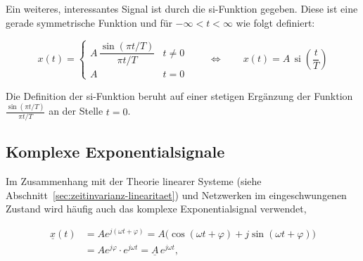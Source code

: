\begin{definition}[si-Funktion]
Ein weiteres, interessantes Signal ist durch die si-Funktion gegeben. Diese ist eine gerade symmetrische Funktion und für $-\infty < t < \infty$ wie folgt definiert:

$$
  x(t) =
  \begin{cases}
    A\,\dfrac{\sin(\pi t/T)}{\pi t/T} & t \neq 0 \\[6pt]
    A                                  & t = 0
  \end{cases}
  \qquad \Leftrightarrow \qquad
  x(t) = A\,\operatorname{si}\!\left(\frac{t}{T}\right)
$$

Die Definition der si-Funktion beruht auf einer stetigen Ergänzung der Funktion $\frac{\sin(\pi t/T)}{\pi t/T}$ an der Stelle $t = 0$.


\begin{center}
\end{center}

\end{definition}

\subsection{Komplexe Exponentialsignale}
\label{sec:komplexe-exponentialsignale}

Im Zusammenhang mit der Theorie linearer Systeme (siehe Abschnitt~\ref{sec:zeitinvarianz-linearitaet})
und Netzwerken im eingeschwungenen Zustand wird häufig auch das komplexe Exponentialsignal verwendet,

\begin{align*}
  \underline{x}(t)
    &= A e^{j(\omega t + \varphi)}
     = A\bigl(\cos(\omega t + \varphi) + j\sin(\omega t + \varphi)\bigr) \\
    &= A e^{j\varphi} \cdot e^{j\omega t}
     = \underline{A}\, e^{j\omega t},
\end{align*}

